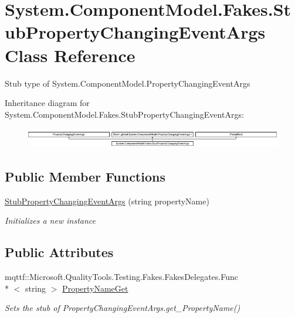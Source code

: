 \hypertarget{class_system_1_1_component_model_1_1_fakes_1_1_stub_property_changing_event_args}{\section{System.\-Component\-Model.\-Fakes.\-Stub\-Property\-Changing\-Event\-Args Class Reference}
\label{class_system_1_1_component_model_1_1_fakes_1_1_stub_property_changing_event_args}
}


Stub type of System.\-Component\-Model.\-Property\-Changing\-Event\-Args 


Inheritance diagram for System.\-Component\-Model.\-Fakes.\-Stub\-Property\-Changing\-Event\-Args\-:\begin{figure}[H]
\begin{center}
\leavevmode
\includegraphics[height=0.893142cm]{class_system_1_1_component_model_1_1_fakes_1_1_stub_property_changing_event_args}
\end{center}
\end{figure}
\subsection*{Public Member Functions}
\begin{DoxyCompactItemize}
\item 
\hyperlink{class_system_1_1_component_model_1_1_fakes_1_1_stub_property_changing_event_args_ac0ced48a6ce1bc71855429459170bb90}{Stub\-Property\-Changing\-Event\-Args} (string property\-Name)
\begin{DoxyCompactList}\small\item\em Initializes a new instance\end{DoxyCompactList}\end{DoxyCompactItemize}
\subsection*{Public Attributes}
\begin{DoxyCompactItemize}
\item 
mqttf\-::\-Microsoft.\-Quality\-Tools.\-Testing.\-Fakes.\-Fakes\-Delegates.\-Func\\*
$<$ string $>$ \hyperlink{class_system_1_1_component_model_1_1_fakes_1_1_stub_property_changing_event_args_a38a050507d348a1bb40b5647a807765c}{Property\-Name\-Get}
\begin{DoxyCompactList}\small\item\em Sets the stub of Property\-Changing\-Event\-Args.\-get\-\_\-\-Property\-Name()\end{DoxyCompactList}\end{DoxyCompactItemize}
